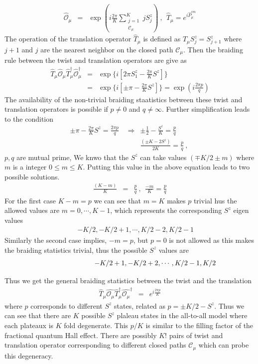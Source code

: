 \documentclass[reprint,prb,superscriptaddress]{revtex4-1}
\begin{document}
\begin{eqnarray}
\hat{\mathcal{O}}_{\mu} &=& \exp({i\frac{2\pi}{K} \displaystyle\sum_{\substack{j=1\\ \mathcal{C}_{\mu}}}^{K} j S_j^z} )~,~~\hat{T}_{\mu}=e^{i\hat{P}^{cm}_{{\mu}}}
\end{eqnarray}
The  operation of the translation operator $\hat{T}_{\mu}$ is defined as $\hat{T}_{\mu} S_j^z = S_{j+1}^z$ where $j+1$ and $j$ are the nearest neighbor on the closed path $\mathcal{C}_{\mu}$. Then the braiding rule between the twist and translation operators are give as
\begin{eqnarray}
\hat{T}_{\mu}\hat{\mathcal{O}}_{\mu} \hat{T}^{\dagger}_{\mu} \hat{\mathcal{O}}_{\mu}^{\dagger}  &=&  \exp\{i[2\pi S_1^z-\frac{2\pi}{K}S^z]\} \nonumber\\
&=& \exp\{i[\pm \pi - \frac{2\pi}{K} S^z]\} =\exp(i\frac{2\pi p}{q})
\end{eqnarray}
The availability of the non-trivial braiding staatistics between these twist and translation operators is possible if $p\neq 0$ and $q\neq \infty$. Further simplification leads to the condition
\begin{eqnarray}
 \pm\pi -\frac{2\pi}{K} S^z = \frac{2\pi p}{q} ~~ &\Rightarrow & \pm\frac{1}{2}-\frac{S^z}{K} = \frac{p}{q} \nonumber\\
&& \frac{(\pm K-2S^z)}{2K} = \frac{p}{q}~,~
\end{eqnarray} 
$p,q$ are mutual prime, We knwo that the $S^z$ can take values $(\mp K/2\pm m)$ where $m$ is a integer $0 \leq m \leq K$. Putting this value in the above equation leads to two possible solutions.
\begin{eqnarray}
\frac{(K-m)}{K} &=& \frac{p}{q} ~,~~ \frac{-m}{K}=\frac{p}{q}
\end{eqnarray}
For the first case $K-m=p$ we can see that $m=K$ makes $p$ trivial hus the allowed values are $m=0,\cdots,K-1$, which represents the corresponding $S^z$ eigen values 
\begin{eqnarray}
&&-K/2,-K/2+1,\cdots,K/2-2,K/2-1
\end{eqnarray}
Similarly the second case implies, $-m=p$, but $p=0$ is not allowed as this makes the braiding statistics trivial, thus the possible $S^z$ values are 
\begin{eqnarray}
&&\hspace{2.2cm} -K/2+1,-K/2+2,\cdots,K/2-1,K/2
\end{eqnarray}

\noindent Thus we get the general braiding statistics between the twist and the translation 
\begin{eqnarray}
\hat{T}_{\mu}\hat{\mathcal{O}_{\mu}} \hat{T}^{\dagger}_{\mu}\hat{\mathcal{O}_{\mu}}^{\dagger} &=& e^{i\frac{2\pi p}{K}}
\end{eqnarray}
where $p$ corresponds to different $S^z$ states, related as $p=\pm K/2-S^z$. Thus we can see that there are $K$ possible $S^z$ plaleau states in the all-to-all model where each plateaux is $K$ fold degenerate. This $p/K$ is similar to the filling factor of the fractional quantum Hall effect. There are possibly $K!$ pairs of twist and translation operator corresponding to different closed paths $\mathcal{C}_{\mu}$ which can probe this degeneracy.
\end{document}
